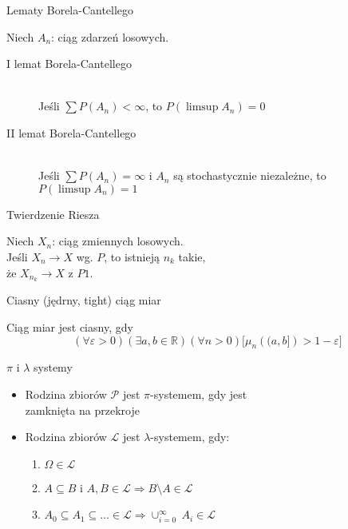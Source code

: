 \documentclass[avery5371,grid,frame]{flashcards}
\begin{document}


\begin{flashcard}[Twierdzenie]{Lematy Borela-Cantellego}

\smallskip
Niech $A_n$: ciąg zdarzeń losowych.
\begin{description}
\item[I lemat Borela-Cantellego] \hfill \\
	Jeśli $\sum P(A_n) < \infty$, to $P\left(\limsup{A_n}\right)=0$
\item[II lemat Borela-Cantellego] \hfill \\
	Jeśli $\sum P(A_n) = \infty$ i $A_n$ są stochastycznie niezależne, to $P\left(\limsup{A_n}\right)=1$ 
\end{description}
\end{flashcard}

\begin{flashcard}[Twierdzenie]{Twierdzenie Riesza}

\smallskip
Niech $X_n$: ciąg zmiennych losowych. \\ 
Jeśli $X_n \rightarrow X$ wg. $P$, to istnieją $n_k$ takie, \\
że $X_{n_k} \rightarrow X$ z $P1$.
\end{flashcard}

\begin{flashcard}[Definicja]{Ciasny (jędrny, tight) ciąg miar}

\smallskip
Ciąg miar jest ciasny, gdy
$$ (\forall \varepsilon > 0)(\exists a, b \in \mathbb{R})(\forall n > 0) \Big[\mu_n \left( (a,b] \right) > 1-\varepsilon \Big] $$
\end{flashcard}

\begin{flashcard}[Definicja]{$\pi$ i $\lambda$ systemy}

\smallskip
\begin{itemize}
\item Rodzina zbiorów $\mathcal{P}$ jest $\pi$-systemem, gdy jest \\
zamknięta na przekroje
\item Rodzina zbiorów $\mathcal{L}$ jest $\lambda$-systemem, gdy:
	\begin{enumerate}
	\item $\Omega \in \mathcal{L}$
	\item $A \subseteq B$ i $A, B \in \mathcal{L} \Rightarrow B \setminus A \in \mathcal{L}$
	\item $A_0 \subseteq A_1 \subseteq \ldots \in \mathcal{L} \Rightarrow \cup^{\infty}_{i=0} \ A_i \in \mathcal{L}$
	\end{enumerate}

\end{itemize}
\end{flashcard}
\end{document}
